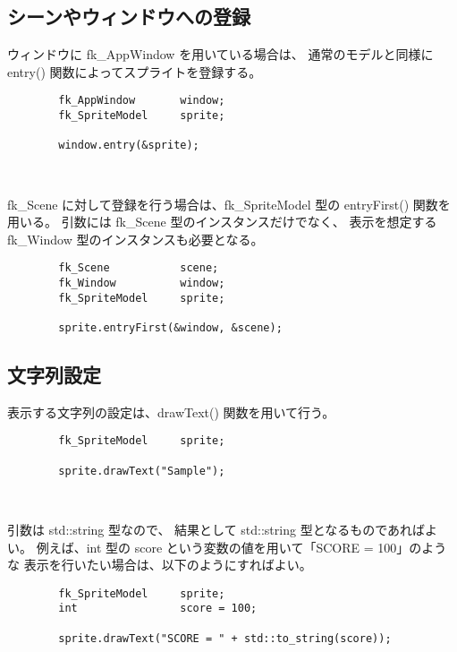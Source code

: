 \subsection{シーンやウィンドウへの登録}

ウィンドウに fk\_AppWindow を用いている場合は、
通常のモデルと同様に entry() 関数によってスプライトを登録する。
\\
\begin{screen}
\begin{verbatim}
        fk_AppWindow       window;
        fk_SpriteModel     sprite;
    
        window.entry(&sprite);
\end{verbatim}
\end{screen}
~

fk\_Scene に対して登録を行う場合は、fk\_SpriteModel 型の entryFirst() 関数を用いる。
引数には fk\_Scene 型のインスタンスだけでなく、
表示を想定する fk\_Window 型のインスタンスも必要となる。
\\
\begin{screen}
\begin{verbatim}
        fk_Scene           scene;
        fk_Window          window;
        fk_SpriteModel     sprite;
    
        sprite.entryFirst(&window, &scene);
\end{verbatim}
\end{screen}

\subsection{文字列設定}
表示する文字列の設定は、drawText() 関数を用いて行う。
\\
\begin{screen}
\begin{verbatim}
        fk_SpriteModel     sprite;
    
        sprite.drawText("Sample");
\end{verbatim}
\end{screen}
~

引数は std::string 型なので、
結果として std::string 型となるものであればよい。
例えば、int 型の score という変数の値を用いて「SCORE = 100」のような
表示を行いたい場合は、以下のようにすればよい。
\\
\begin{screen}
\begin{verbatim}
        fk_SpriteModel     sprite;
        int                score = 100;
    
        sprite.drawText("SCORE = " + std::to_string(score));
\end{verbatim}
\end{screen}
~

